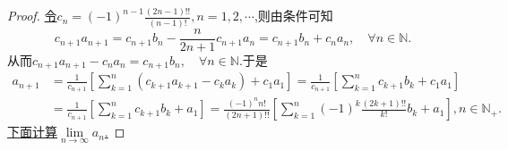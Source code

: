 \documentclass[../../main.tex]{subfiles}
\begin{document}
\begin{proof}
\hyperlink{构造数列c_n的思路}{令\(c_n = (-1)^{n - 1}\frac{(2n - 1)!!}{(n - 1)!},n=1,2,\cdots\)},则由条件可知
\[
c_{n + 1}a_{n + 1}=c_{n + 1}b_n-\frac{n}{2n + 1}c_{n + 1}a_n=c_{n + 1}b_n + c_na_n, \quad \forall n\in \mathbb{N}.
\]
从而\(c_{n + 1}a_{n + 1}-c_na_n=c_{n + 1}b_n, \quad \forall n\in \mathbb{N}\).于是
\begin{align}
a_{n+1}&=\frac{1}{c_{n+1}}\left[ \sum_{k=1}^n{\left( c_{k+1}a_{k+1}-c_ka_k \right)}+c_1a_1 \right] =\frac{1}{c_{n+1}}\left[ \sum_{k=1}^n{c_{k+1}b_k}+c_1a_1 \right] 
\nonumber
\\
&=\frac{1}{c_{n+1}}\left[ \sum_{k=1}^n{c_{k+1}b_k}+a_1 \right] =\frac{\left( -1 \right) ^nn!}{\left( 2n+1 \right) !!}\left[ \sum_{k=1}^n{\left( -1 \right) ^k\frac{\left( 2k+1 \right) !!}{k!}b_k}+a_1 \right] ,n\in \mathbb{N} _+. \label{example4.44-1.1}
\end{align}
\hyperlink{example4.44解法的思路分析}{下面计算$\underset{n\rightarrow \infty}{\lim}a_n$.}


\end{proof}
\end{document}
